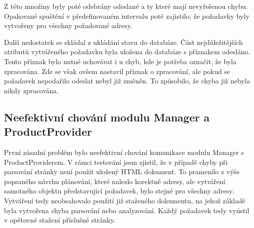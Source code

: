 \documentclass[thesis=B,czech]{FITthesis}[2012/06/26]
\begin{document}
Z této množiny byly poté odebrány odeslané a ty které mají nevyřešenou chybu. Opakované spuštění v předefinovaném intervalu poté 
zajistilo, že požadavky byly vytvořeny pro všechny požadované adresy.
\par
Další nedostatek se skládal z ukládání stavu do databáze. Část nejdůležitějších atributů vytvářeného požadavku byla uložena do databáze 
s příznakem odesláno. Tento příznak bylo nutné uchovávat i u chyb, kde je potřeba označit, že byla zpracována. Zde se však 
ovšem nastavil příznak o zpracování, ale pokud se požadavek nepodařilo odeslat nebyl již změněn. To způsobilo, že chyba již 
nebyla nikdy zpracována.

\subsection{Neefektivní chování modulu Manager a ProductProvider}\label{ch:manager-pd}
První zásadní problém bylo neefektivní chování komunikace modulu Manager s ProductProviderem. V rámci testování jsem zjistil, že v 
případě chyby při parsování stránky není použit uložený HTML dokument.
To pramenilo z výše popsaného návrhu plánování, které nalezlo korektně adresy, ale vytváření samotného objektu představující požadavek,
bylo stejné pro všechny adresy. Vytváření tedy neobsahovalo použití již staženého dokumentu, na jehož základě byla vytvořena 
chyba parsování nebo analyzování. Každý požadavek tedy vyústil v opětovné stažení příslušné stránky.
\end{document}
